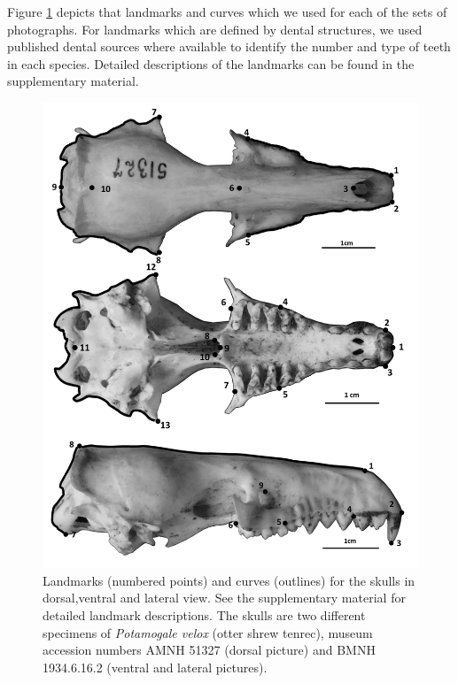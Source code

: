 \documentclass[12pt,a4paper]{article}
\begin{document}
	Figure \ref{fig:landmarks} depicts that landmarks and curves which we used for each of the sets of photographs. For landmarks which are defined by dental structures, we used published dental sources \citep{Repenning1967, Eisenberg1969, Nowak1983, MacPhee1987, KnoxJones1992, Davis1997, Querouil2001, Nagorsen2002, Wilson2005, Goodman2006, Karatas2007, Hoffmann2008, Asher2008,  Muldoon2009, Lin2010} where available to identify the number and type of teeth in each species. Detailed descriptions of the landmarks can be found in the supplementary material.
	\begin{figure}[!htbp]
		\centering
		\includegraphics[width=1\linewidth]{figures/skdors+skvent+sklat_BW.png}
		\caption[Skulls: dorsal, ventral and lateral landmarks]
		{Landmarks (numbered points) and curves (outlines) for the skulls in dorsal,ventral and lateral view. See the supplementary material for detailed landmark descriptions. The skulls are two different specimens of \textit{Potamogale velox} (otter shrew tenrec), museum accession numbers AMNH 51327 (dorsal picture) and BMNH 1934.6.16.2 (ventral and lateral pictures). }
		\label{fig:landmarks}
	\end{figure}
	
\end{document}
